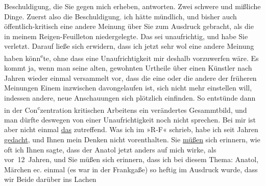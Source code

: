 \begin{ledgroupsized}[t]{13cm}
               Beschuldigung, die Sie gegen mich erheben, antworten. Zwei schwere und  mißliche Dinge.\pend
           \pstart
           Zuerst also die Beschuldigung\textcolor{gray}{,} ich hätte mündlich, und bisher auch
               öffentlich-kritisch eine andere Meinung über Sie zum Ausdruck gebracht, als die in
               meinem Reigen-Feuilleton
               niedergelegte. Das sei unaufrichtig, und habe Sie verletzt.\pend
           \pstart
           Darauf ließe sich erwidern, dass ich jetzt sehr wol eine andere Meinung haben könn\substVorne{}\textsuperscript{e}\substDazwischen{}te\substHinten{}, ohne dass eine Unaufrichtigkeit mir deshalb vorzuwerfen wäre. Es kommt ja,
               wenn man seine alten, gewohnten Urtheile über einen Künstler nach Jahren wieder
               einmal versammelt \introOben{}vor\introOben{}, dass die eine oder die andere der
               früheren Meinungen Einem inzwischen davongelaufen ist, sich nicht mehr einstellen
               will, indessen andere, neue Anschauungen sich plötzlich einfinden. So entstünde dann
               in der Con\substVorne{}\textsuperscript{c}\substDazwischen{}z\substHinten{}entration kritischen Arbeitens ein verändertes Gesammtbild, und man dürfte
               deswegen von einer Unaufrichtigkeit noch nicht sprechen.\pend
           \pstart
           Bei mir ist aber nicht einmal \uline{das} zutreffend. Was ich
               im »R-F« schrieb, habe ich
               seit Jahren \uline{gedacht}, und Ihnen mein Denken nicht
               vorenthalten. Sie \uline{müßen} sich erinnern, wie oft ich
               Ihnen sagte, dass der Anatol jetzt anders auf
               mich wirke, als vor 12 Jahren, und Sie müßen sich erinnern, dass ich bei diesem
               Thema: Anatol, Märchen ec. einmal (es war in der Frankgaße) so heftig im Ausdruck wurde, dass wir Beide darüber ins Lachen

\end{ledgroupsized}
